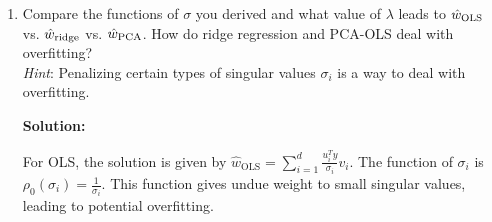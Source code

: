\documentclass{article}
\newenvironment{solution}{\color{blue} \smallskip \textbf{Solution:}}{}
\begin{document}
\begin{enumerate}
\begin{enumerate}[(i)]
\begin{solution}
Also, knowing that \(V_k^T V = I\), the value of \(V_k^T V\) is the identity matrix of size \(k \times k\).




\end{solution}

\item Note that the $\hatwPCA \in \mathbb{R}^{k}$ you computed above is the vector of features applied to matrix $XV_{k}$. The actual features applied to $X$ is the vector $V_{k}\hatwPCA \in \mathbb{R}^{d}$. Rewrite $V_{k}\hatwPCA$ in summation form similar to that in part (a). 

\begin{solution}


Firstly, from part (a), we know that: 
\( \hat{w}_{\text{PCA}} = \sum_{i=1}^{k} \frac{u_i^T y}{\sigma_i} e_i \),
where \(u_i\) are the left singular vectors of \(X\), \(\sigma_i\) are the singular values, and \(e_i\) are the basis vectors of \(\mathbb{R}^k\).

Secondly, multiplying by \(V_k\), we get: 
\( V_k \hat{w}_{\text{PCA}} = V_k \left( \sum_{i=1}^{k} \frac{u_i^T y}{\sigma_i} e_i \right) \).

Thirdly, since \(V_k\) contains the top \(k\) right singular vectors \(v_1, v_2, \dots, v_k\), we can write this as: 
\( V_k \hat{w}_{\text{PCA}} = \sum_{i=1}^{k} \frac{u_i^T y}{\sigma_i} v_i \),
where \(v_i \in \mathbb{R}^d\) are the right singular vectors of \(X\).

Finally, the final expression for \(V_k \hat{w}_{\text{PCA}}\) in summation form is: 
\( V_k \hat{w}_{\text{PCA}} = \sum_{i=1}^{k} \frac{u_i^T y}{\sigma_i} v_i \).




\end{solution}
\end{enumerate}

\newpage
\item 
Compare the functions of $\sigma$ you derived and what value of $\lambda$ leads to $\hat{{w}}_{\text{OLS}}$ vs. $\hat{{w}}_{\text{ridge}}$ vs. $\hat{ {w}}_\text{{PCA}}$. How do ridge regression and PCA-OLS deal with overfitting?\\
\textit{Hint}: Penalizing certain types of singular values $\sigma_i$ is a way to deal with overfitting.

\begin{solution}

For OLS, the solution is given by \( \hat{w}_{\text{OLS}} = \sum_{i=1}^{d} \frac{u_i^T y}{\sigma_i} v_i \). The function of \(\sigma_i\) is \( \rho_0(\sigma_i) = \frac{1}{\sigma_i} \). This function gives undue weight to small singular values, leading to potential overfitting. \\


\end{solution}
\end{enumerate}
\end{document}
